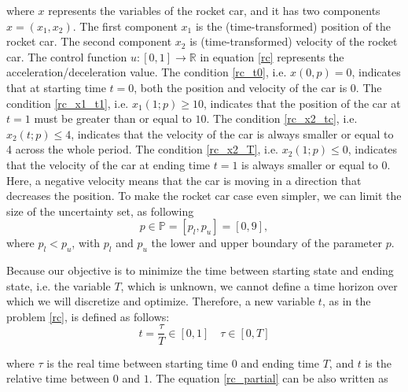 \documentclass  [
  paper    = a4,
  BCOR     = 10mm,
  twoside,
  fontsize = 12pt,
  fleqn,
  toc      = bibnumbered,
  toc      = listofnumbered,
  numbers  = noendperiod,
  headings = normal,
  listof   = leveldown,
  version  = 3.03
]                                       {scrreprt}
\newcommand{\<}{\langle}
\renewcommand{\>}{\rangle}
\begin{document}
where $x$ represents the variables of the rocket car, and it has two components $ x = (x_1, x_2)$. The first component $x_1$ is the (time-transformed) position of the rocket car. The second component $x_2$ is (time-transformed) velocity of the rocket car. The control function $ u: [0,1] \rightarrow \mathbb{R}$ in equation \ref{rc} represents the acceleration/deceleration value. The condition \ref{rc_t0}, i.e. $x(0,p) = 0$, indicates that at starting time $t=0$, both the position and velocity of the car is $0$. The condition \ref{rc_x1_t1}, i.e. $x_1(1;p) \geq 10$, indicates that the position of the car at $t=1$ must be greater than or equal to $10$. The condition \ref{rc_x2_tc}, i.e. $x_2(t;p) \leq 4$, indicates that the velocity of the car is always smaller or equal to 4 across the whole period. The condition \ref{rc_x2_T}, i.e. $x_2(1;p) \leq 0$, indicates that the velocity of the car at ending time $t=1$ is always smaller or equal to $0$.  Here, a negative velocity means that the car is moving in a direction that decreases the position.  To make the rocket car case even simpler, we can limit the size of the uncertainty set, as following
\begin{equation}
	p \in \mathbb{P} = [p_l, p_u] = [0,9],
	\label{uncertainP}
\end{equation}
where $p_l < p_u$, with $p_l$ and $p_u$ the lower and upper boundary of the parameter $p$. 


Because our objective is to minimize the time between starting state and ending state, i.e. the variable $T$, which is unknown, we cannot define a time horizon over which we will discretize and optimize. Therefore, a new variable $t$, as in the problem \ref{rc}, is defined as follows: 
\begin{equation}
	t= \frac{\tau}{T} \in [0,1] \quad \tau \in [0, T]
	\label{eqn:timet}
\end{equation}

where $\tau$ is the real time between starting time $0$ and ending time $T$, and $t$ is the relative time between $0$ and $1$.  The equation \ref{rc_partial} can be also written as 
\end{document}
